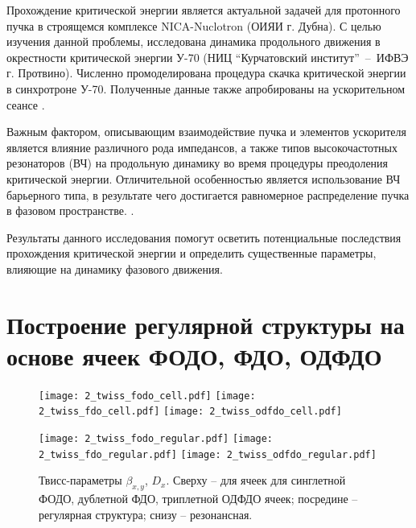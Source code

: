 \par Прохождение критической энергии является актуальной задачей для протонного пучка в строящемся комплексе NICA-Nuclotron (ОИЯИ г. Дубна). С целью изучения данной проблемы, исследована динамика продольного движения в окрестности критической энергии У-70 (НИЦ “Курчатовский институт”~--~ИФВЭ г. Протвино). Численно промоделирована процедура скачка критической энергии в синхротроне У-70. Полученные данные также апробированы на ускорительном сеансе \cite{Kolokolchikov:2025_U70}.

\par Важным фактором, описывающим взаимодействие пучка и элементов ускорителя является влияние различного рода импедансов, а также типов высокочастотных резонаторов (ВЧ) на продольную динамику во время процедуры преодоления критической энергии. Отличительной особенностью является использование ВЧ барьерного типа, в результате чего достигается равномерное распределение пучка в фазовом пространстве. \cite{hans:bb}.

\par Результаты данного исследования помогут осветить потенциальные последствия прохождения критической энергии и определить существенные параметры, влияющие на динамику фазового движения.

	\section{Построение регулярной структуры на основе ячеек ФОДО, ФДО, ОДФДО}\label{sec:transition_jump/FODO_FDO}



\begin{figure} [h!]

   \texttt{[image: 2\_twiss\_fodo\_cell.pdf]}
   \texttt{[image: 2\_twiss\_fdo\_cell.pdf]}
   \texttt{[image: 2\_twiss\_odfdo\_cell.pdf]}

   \texttt{[image: 2\_twiss\_fodo\_regular.pdf]}
   \texttt{[image: 2\_twiss\_fdo\_regular.pdf]}
   \texttt{[image: 2\_twiss\_odfdo\_regular.pdf]}

   \caption{Твисс-параметры $\beta_{x,y}$, $D_{x}$. Сверху -- для ячеек для синглетной ФОДО, дублетной ФДО, триплетной ОДФДО ячеек; посредине -- регулярная структура; снизу -- резонансная.}
   \label{fig:fodo_fdo_odfdo_regular}
\end{figure}


